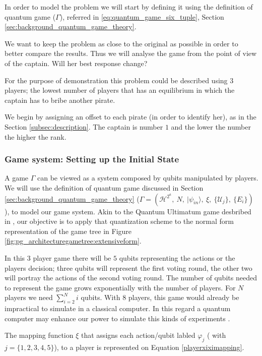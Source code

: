 In order to model the problem we will start by defining it using the definition of quantum game ($\Gamma$), referred in \ref{eq:quantum_game_six_tuple}, Section \ref{sec:background_quantum_game_theory}\cite{Fra2011a}.

We want to keep the problem as close to the original as possible in order to better compare the results. Thus we will analyse the game from the point of view of the captain. Will her best response change?

For the purpose of demonstration this problem could be described using $3$ players; the lowest number of players that has an equilibrium in which the captain has to bribe another pirate. 

We begin by assigning an offset to each pirate (in order to identify her), as in the Section \ref{subsec:description}. The captain is number $1$ and the lower the number the higher the rank. 



\subsubsection{Game system: Setting up the Initial State}
\label{subsec:pirates_initialstate}

A game $\Gamma$ can be viewed as a system composed by qubits manipulated by players. We will use the definition of quantum game discussed in Section \ref{sec:background_quantum_game_theory} ($\Gamma=(\mathcal{H}^{2^{a}},\: N,\:\vert\psi_{in}\rangle,\:\xi,\:\{\mathcal{U}_{j}\},\:\{E_{i}\})
$), to model our game system. Akin to the Quantum Ultimatum game desbribed in \cite{Fra2011}, our objective is to apply that quantization scheme to the normal form representation of the game tree in Figure \ref{fig:pg_architecturegametree:extensiveform}.


In this $3$ player game there will be $5$ qubits representing the actions or the players decision; three qubits will represent the first voting round, the other two will portray the actions of the second voting round.
The number of qubits needed to represent the game grows exponentially with the number of players. For $N$ players we need $\sum_{i=2}^{N}{i}$ qubits. With 8 players, this game would already be impractical to simulate in a classical computer. In this regard a quantum computer may enhance our power to simulate this kinds of experiments \cite{Rieffel2011}.

The mapping function $\xi$ that assigns each action/qubit labled $\varphi_{j}$ ( with $j=\{ 1, 2, 3, 4, 5\}$), to a player is represented on Equation \ref{playerxiximapping}. 

